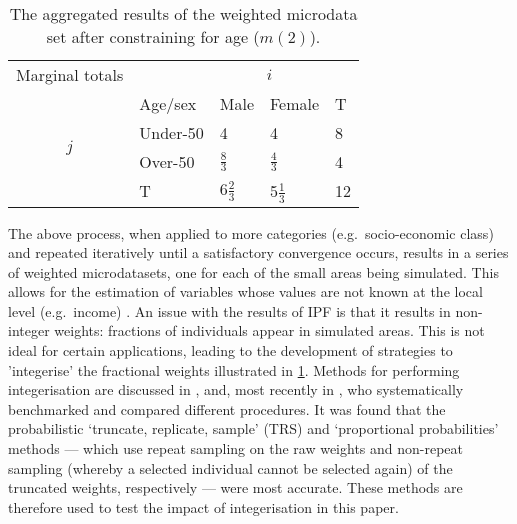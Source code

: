 \documentclass[a4paper,10pt]{article}
\begin{document}
\begin{table}[htbp]
\centering
\caption[Aggregated results after constraining for age]{The
aggregated results of the weighted
microdata set after constraining for age ($m(2)$).
}

\begin{tabular}{cllll}\toprule
Marginal totals&  & \multicolumn{2}{c}{$i$} & \\
& Age/sex & Male & Female & T\\ \midrule
\multirow{2}{*}{$j$} & Under-50 & 4 & 4 & 8\\
& Over-50 & $\frac{8}{3}$ & $\frac{4}{3}$ & 4 \\
& T & $6\frac{2}{3}$ & 5$\frac{1}{3}$ & 12\\
\bottomrule
\end{tabular}
\label{t:m2}
\end{table}

The above process, when applied to more categories (e.g.~socio-economic class)
and repeated iteratively until a satisfactory convergence occurs, results in a
series of weighted microdatasets, one for each of the small areas being
simulated. This allows for the estimation of variables whose values are not
known at the local level (e.g.~income) \citep{Ballas2005c}. An issue
with the results of IPF
is that it results in non-integer weights: fractions of individuals
appear in simulated areas. This is not ideal
for certain applications, leading to the development of strategies
to 'integerise' the fractional weights illustrated in \cref{t:m2}.
Methods for performing integerisation are discussed in
\citep{Ballas2005c}, \citep{Pritchard2012} and, most recently
in \citep{Lovelace2013-trs}, who
systematically benchmarked and compared different procedures.
It was found that the probabilistic `truncate, replicate, sample' (TRS)
and `proportional probabilities' methods --- which use repeat sampling
on the raw weights and non-repeat sampling (whereby a selected individual
cannot be selected again) of the truncated weights, respectively ---
were most accurate.
These methods are therefore used to test the impact of
integerisation in this paper.

\end{document}

